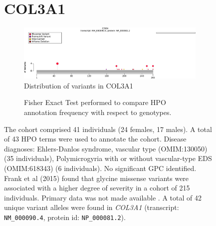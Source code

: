 \begin{figure}[htbp]
\section*{COL3A1}
\centering
\begin{subfigure}[b]{0.95\textwidth}
\centering
\includegraphics[width=\textwidth]{img/COL3A1_protein_diagram.pdf} 
\captionsetup{justification=raggedright,singlelinecheck=false}
\caption{Distribution of variants in COL3A1}
\end{subfigure}

\vspace{2em}

\begin{subfigure}[b]{0.95\textwidth}
\centering
{}
\captionsetup{justification=raggedright,singlelinecheck=false}
\caption{Fisher Exact Test performed to compare HPO annotation frequency with respect to genotypes.}
\end{subfigure}

\vspace{2em}

\caption{ The cohort comprised 41 individuals (24 females, 17 males). A total of 43 HPO terms were used to annotate the cohort. 
Disease diagnoses: Ehlers-Danlos syndrome, vascular type (OMIM:130050) (35 individuals), Polymicrogyria with or without vascular-type EDS (OMIM:618343) 
(6 individuals). No significant GPC identified. 
Frank et al (2015) found that glycine missense variants were associated with a higher degree of severity in a cohort of 215 individuals. 
Primary data was not made available \cite{PMID_25758994}. A total of 42 unique variant alleles were found in \textit{COL3A1} (transcript: \texttt{NM\_000090.4}, protein id: \texttt{NP\_000081.2}).}
\end{figure}
